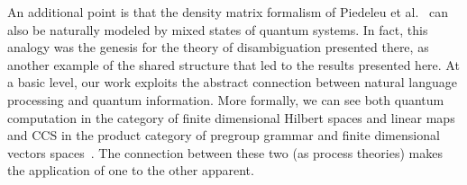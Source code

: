An additional point is that the density matrix formalism of Piedeleu et al.~\cite{piedeleu2015open} can also be naturally modeled by mixed states of quantum systems.  In fact, this analogy was the genesis for the theory of disambiguation presented there, as another example of the shared structure that led to the results presented here. At a basic level, our work exploits the abstract connection between natural language processing and quantum information.  More formally,  we can see both quantum computation in the category of finite dimensional Hilbert spaces and linear maps~\cite{abramsky2004categorical,cqm-notes} and CCS in the product category of pregroup grammar and finite dimensional vectors spaces~\cite{coecke2010mathematical}. The connection between these two (as process theories) makes the application of one to the other apparent.

